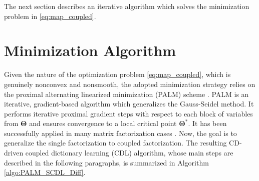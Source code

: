 \documentclass[review]{elsarticle}
\begin{document}
%
The next section describes an iterative algorithm which solves the minimization problem in \eqref{eq:map_coupled}.

\section{Minimization Algorithm}
\label{sec:min_alg}

Given the nature of the optimization problem \eqref{eq:map_coupled}, which is genuinely nonconvex and nonsmooth, the adopted minimization strategy relies on the proximal alternating linearized minimization (PALM) scheme \citep{bolte_proximal_2014}. PALM is an iterative, gradient-based algorithm which generalizes the Gauss-Seidel method. It performs iterative proximal gradient steps with respect to each block of variables from $\boldsymbol{\Theta}$ and ensures convergence to a local critical point $\boldsymbol{\Theta}^{*}$. It has been successfully applied in many matrix factorization cases \citep{bolte_proximal_2014,cavalcanti_unmixing_2017,thouvenin_online_2016}. Now, the goal is to generalize the single factorization to coupled factorization. The resulting CD-driven coupled dictionary learning (CDL) algorithm, whose main steps are described in the following paragraphs, is summarized in Algorithm \ref{algo:PALM_SCDL_Diff}.
%
\end{document}
